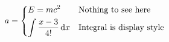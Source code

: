 \documentclass[varwidth]{standalone}
\begin{document}
\[
    a = \begin{dcases*}
        E = m c^2                          & Nothing to see here       \\
        \int \frac{x-3}{4!} \, \mathrm{d}x & Integral is display style
    \end{dcases*}
\]
\end{document}
